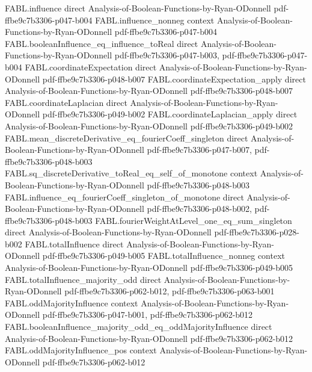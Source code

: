 \begin{theorem}
\proofstep
  {FABL.influence}
  {direct}
  {Analysis-of-Boolean-Functions-by-Ryan-ODonnell}
  {pdf-ffbe9c7b3306-p047-b004}
\proofstep
  {FABL.influence_nonneg}
  {context}
  {Analysis-of-Boolean-Functions-by-Ryan-ODonnell}
  {pdf-ffbe9c7b3306-p047-b004}
\proofstep
  {FABL.booleanInfluence_eq_influence_toReal}
  {direct}
  {Analysis-of-Boolean-Functions-by-Ryan-ODonnell}
  {pdf-ffbe9c7b3306-p047-b003,
    pdf-ffbe9c7b3306-p047-b004}
\proofstep
  {FABL.coordinateExpectation}
  {direct}
  {Analysis-of-Boolean-Functions-by-Ryan-ODonnell}
  {pdf-ffbe9c7b3306-p048-b007}
\proofstep
  {FABL.coordinateExpectation_apply}
  {direct}
  {Analysis-of-Boolean-Functions-by-Ryan-ODonnell}
  {pdf-ffbe9c7b3306-p048-b007}
\proofstep
  {FABL.coordinateLaplacian}
  {direct}
  {Analysis-of-Boolean-Functions-by-Ryan-ODonnell}
  {pdf-ffbe9c7b3306-p049-b002}
\proofstep
  {FABL.coordinateLaplacian_apply}
  {direct}
  {Analysis-of-Boolean-Functions-by-Ryan-ODonnell}
  {pdf-ffbe9c7b3306-p049-b002}
\proofstep
  {FABL.mean_discreteDerivative_eq_fourierCoeff_singleton}
  {direct}
  {Analysis-of-Boolean-Functions-by-Ryan-ODonnell}
  {pdf-ffbe9c7b3306-p047-b007,
    pdf-ffbe9c7b3306-p048-b003}
\proofstep
  {FABL.sq_discreteDerivative_toReal_eq_self_of_monotone}
  {context}
  {Analysis-of-Boolean-Functions-by-Ryan-ODonnell}
  {pdf-ffbe9c7b3306-p048-b003}
\proofstep
  {FABL.influence_eq_fourierCoeff_singleton_of_monotone}
  {direct}
  {Analysis-of-Boolean-Functions-by-Ryan-ODonnell}
  {pdf-ffbe9c7b3306-p048-b002,
    pdf-ffbe9c7b3306-p048-b003}
\proofstep
  {FABL.fourierWeightAtLevel_one_eq_sum_singleton}
  {direct}
  {Analysis-of-Boolean-Functions-by-Ryan-ODonnell}
  {pdf-ffbe9c7b3306-p028-b002}
\proofstep
  {FABL.totalInfluence}
  {direct}
  {Analysis-of-Boolean-Functions-by-Ryan-ODonnell}
  {pdf-ffbe9c7b3306-p049-b005}
\proofstep
  {FABL.totalInfluence_nonneg}
  {context}
  {Analysis-of-Boolean-Functions-by-Ryan-ODonnell}
  {pdf-ffbe9c7b3306-p049-b005}
\proofstep
  {FABL.totalInfluence_majority_odd}
  {direct}
  {Analysis-of-Boolean-Functions-by-Ryan-ODonnell}
  {pdf-ffbe9c7b3306-p062-b012,
    pdf-ffbe9c7b3306-p063-b001}
\proofstep
  {FABL.oddMajorityInfluence}
  {context}
  {Analysis-of-Boolean-Functions-by-Ryan-ODonnell}
  {pdf-ffbe9c7b3306-p047-b001,
    pdf-ffbe9c7b3306-p062-b012}
\proofstep
  {FABL.booleanInfluence_majority_odd_eq_oddMajorityInfluence}
  {direct}
  {Analysis-of-Boolean-Functions-by-Ryan-ODonnell}
  {pdf-ffbe9c7b3306-p062-b012}
\proofstep
  {FABL.oddMajorityInfluence_pos}
  {context}
  {Analysis-of-Boolean-Functions-by-Ryan-ODonnell}
  {pdf-ffbe9c7b3306-p062-b012}

\end{theorem}
